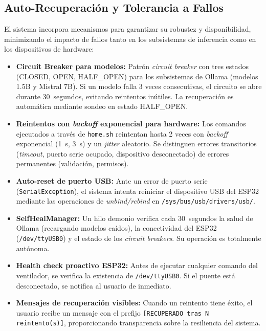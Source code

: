 \subsection{Auto-Recuperación y Tolerancia a Fallos}
\label{sec:auto_recuperacion}

El sistema incorpora mecanismos para garantizar su robustez y disponibilidad, minimizando el impacto de fallos tanto en los subsistemas de inferencia como en los dispositivos de hardware:

\begin{itemize}
    \item \textbf{Circuit Breaker para modelos:} Patrón \textit{circuit breaker} con tres estados (CLOSED, OPEN, HALF\_OPEN) para los subsistemas de Ollama (modelos 1.5B y Mistral 7B). Si un modelo falla 3 veces consecutivas, el circuito se abre durante 30~segundos, evitando reintentos inútiles. La recuperación es automática mediante sondeo en estado HALF\_OPEN.
    \item \textbf{Reintentos con \textit{backoff} exponencial para hardware:} Los comandos ejecutados a través de \texttt{home.sh} reintentan hasta 2 veces con \textit{backoff} exponencial (1~s, 3~s) y un \textit{jitter} aleatorio. Se distinguen errores transitorios (\textit{timeout}, puerto serie ocupado, dispositivo desconectado) de errores permanentes (validación, permisos).
    \item \textbf{Auto-reset de puerto USB:} Ante un error de puerto serie (\texttt{SerialException}), el sistema intenta reiniciar el dispositivo USB del ESP32 mediante las operaciones de \textit{unbind/rebind} en \texttt{/sys/bus/usb/drivers/usb/}.
    \item \textbf{SelfHealManager:} Un hilo demonio verifica cada 30~segundos la salud de Ollama (recargando modelos caídos), la conectividad del ESP32 (\texttt{/dev/ttyUSB0}) y el estado de los \textit{circuit breakers}. Su operación es totalmente autónoma.
    \item \textbf{Health check proactivo ESP32:} Antes de ejecutar cualquier comando del ventilador, se verifica la existencia de \texttt{/dev/ttyUSB0}. Si el puente está desconectado, se notifica al usuario de inmediato.
    \item \textbf{Mensajes de recuperación visibles:} Cuando un reintento tiene éxito, el usuario recibe un mensaje con el prefijo \texttt{[RECUPERADO tras N reintento(s)]}, proporcionando transparencia sobre la resiliencia del sistema.
\end{itemize}

